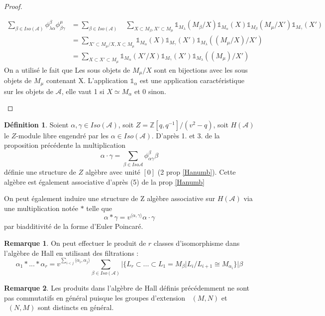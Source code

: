 \documentclass[12pt]{article}
\DeclareMathOperator{\ext}{Ext^{1}}
\theoremstyle{definition}
\newtheorem{rem}{Remarque}[section]
\newtheorem{Def}{Définition}[section]
\begin{document}
\begin{proof}
\begin{enumerate}
\begin{align*}
    \underset{\beta\in Iso(\mathcal{A})}\sum \phi^{\beta}_{\lambda\alpha}\phi^{\mu}_{\beta\gamma}& =  \underset{\beta\in Iso(\mathcal{A})}\sum\quad\underset{X\subset M_{\beta}, X'\subset M_{\mu}}\sum\mathds{1}_{M_{\lambda}}(M_{\beta}/X)\mathds{1}_{M_{\alpha}}(X)\mathds{1}_{M_{\beta}}(M_{\mu}/X')\mathds{1}_{M_{\gamma}}(X')\\
   & =  \underset{X'\subset M_{\mu}/X , X\subset M_{\mu}}\sum\mathds{1}_{M_{\alpha}}(X)\mathds{1}_{M_{\gamma}}(X')\mathds{1}_{M_{\lambda}}((M_{\mu}/X)/X')\\
   & =  \underset{X\subset X'\subset M_{\mu}}\sum\mathds{1}_{M_{\alpha}}(X'/X)\mathds{1}_{M_{\gamma}}(X')\mathds{1}_{M_{\lambda}}((M_{\mu})/X')
   \end{align*}
On a utilisé le fait que Les sous objets de $M_{\mu}/X$ sont en bijections avec les sous objets de $M_{\mu}$ contenant X. L'application $\mathds{1}_\alpha$ est une application caractéristique sur les objets de $\mathcal{A}$, elle vaut 1 si $X\simeq M_\alpha$ et 0 sinon.
\end{enumerate}
\end{proof}
\begin{Def}\textnormal{
 Soient $\alpha,\gamma\in Iso(\mathcal{A})$, soit $Z=\mathbb{Z}[q,q^{-1}]/(v^2-q)$, soit $H(\mathcal{A})$ le $Z$-module libre engendré par les $\alpha\in Iso(\mathcal{A})$. D'après 1. et 3. de la proposition précédente la multiplication \begin{equation} \alpha\cdot\gamma=\underset{\beta\in Iso{\mathcal{A}}}\sum \phi^{\beta}_{\alpha\gamma}\beta \label{HAprod}\end{equation} définie une structure de $Z$ algèbre avec unité $[0]$ (2 prop \ref{Hanumb}). Cette algèbre est également associative d'après (5) de la prop \ref{Hanumb}}
\end{Def}
On peut également induire une structure de Z algèbre associative sur $H(\mathcal{A})$  via une multiplication notée $\ast$ telle que \begin{equation} \alpha\ast\gamma=v^{\langle \alpha,\gamma\rangle}\alpha\cdot\gamma \label{Ringprod}\end{equation} par biadditivité de la forme d'Euler Poincaré.
\begin{rem} On peut effectuer le produit de $r$ classes d'isomorphisme dans l'algèbre de Hall en utilisant des filtrations : $$\alpha_1\ast ...\ast\alpha_r=v^{\underset{i<j}{\sum}\langle\alpha_i,\alpha_j\rangle}\underset{\beta\in Iso(\mathcal{A})}{\sum}\vert\{ L_r\subset...\subset L_1=M_{\beta}|L_i/L_{i+1}\cong M_{\alpha_i}\}\vert \beta$$  \end{rem}
\begin{rem} Les produits dans l'algèbre de Hall définis précédemment ne sont pas commutatifs en général puisque les groupes d'extension $\ext(M,N)$ et $\ext(N,M)$ sont distincts en général.\end{rem}
\end{document}
